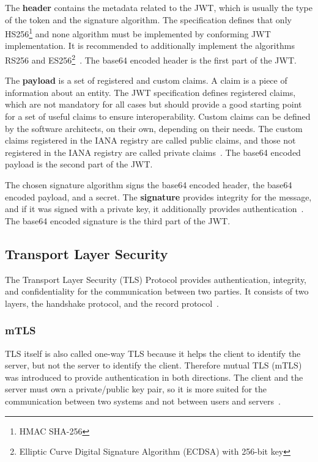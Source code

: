 The \textbf{header} contains the metadata related to the JWT, which is usually the type of the token and the signature algorithm.
The specification defines that only HS256\footnote{HMAC SHA-256} and none algorithm must be implemented  by conforming JWT implementation.
It is recommended to additionally implement the algorithms RS256 and ES256\footnote{Elliptic Curve Digital Signature Algorithm (ECDSA) with 256-bit key}~\cite{jwtdocauth0, jwtrfc}.
The base64 encoded header is the first part of the JWT.

The \textbf{payload} is a set of registered and custom claims.
A claim is a piece of information about an entity.
The JWT specification defines registered claims, which are not mandatory for all cases but should provide a good starting point for a set of useful claims to ensure interoperability.
Custom claims can be defined by the software architects, on their own, depending on their needs.
The custom claims registered in the IANA registry are called public claims, and those not registered in the IANA registry are called private claims~\cite{jwtdocauth0, jwtrfc}.
The base64 encoded payload is the second part of the JWT.

The chosen signature algorithm signs the base64 encoded header, the base64 encoded payload, and a secret.
The \textbf{signature} provides integrity for the message, and if it was signed with a private key, it additionally provides authentication~\cite{jwtdocauth0}.
The base64 encoded signature is the third part of the JWT.

\subsection{Transport Layer Security}
The Transport Layer Security (TLS) Protocol provides authentication, integrity, and confidentiality for the communication between two parties.
It consists of two layers, the handshake protocol, and the record protocol~\cite{turnertls}.

\subsubsection{mTLS} \label{sec:mtls}
TLS itself is also called one-way TLS because it helps the client to identify the server, but not the server to identify the client.
Therefore mutual TLS (mTLS) was introduced to provide authentication in both directions.
The client and the server must own a private/public key pair, so it is more suited for the communication between two systems and not between users and servers~\cite{dias2020microservices}. 

